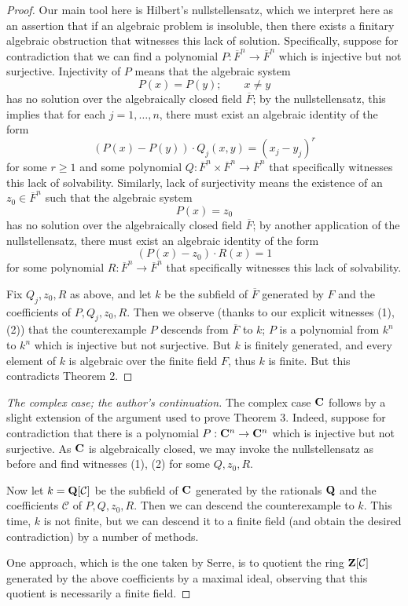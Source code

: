\begin{proof}
Our main tool here is Hilbert's nullstellensatz, which we interpret here as an assertion that if an algebraic problem is insoluble, then there exists a finitary algebraic obstruction that witnesses this lack of solution. Specifically, suppose for contradiction that we can find a polynomial $P:\overline F^n\to\overline F^n$ which is injective but not surjective. Injectivity of $P$ means that the algebraic system
\[P(x)=P(y);\qquad x\ne y\]
has no solution over the algebraically closed field $\overline F$; by the nullstellensatz, this implies that for each $j=1,\dots,n$, there must exist an algebraic identity of the form
\[(P(x)-P(y))\cdot Q_j(x,y)=(x_j-y_j)^r \tag{1}\]
for some $r\ge1$ and some polynomial $Q:\overline F^n\times\overline F^n\to\overline F^n$ that specifically witnesses this lack of solvability. Similarly, lack of surjectivity means the existence of an $z_0\in\overline F^n$ such that the algebraic system
\[P(x)=z_0\]
has no solution over the algebraically closed field $\overline F$; by another application of the nullstellensatz, there must exist an algebraic identity of the form
\[(P(x)-z_0)\cdot R(x)=1 \tag{2}\]
for some polynomial $R:\overline F^n\to\overline F^n$ that specifically witnesses this lack of solvability.

Fix $Q_j,z_0,R$ as above, and let $k$ be the subfield of $\overline F$ generated by $F$ and the coefficients of $P,Q_j,z_0,R$. Then we observe (thanks to our explicit witnesses (1), (2)) that the counterexample $P$ descends from $\overline F$ to $k$; $P$ is a polynomial from $k^n$ to $k^n$ which is injective but not surjective. But $k$ is finitely generated, and every element of $k$ is algebraic over the finite field $F$, thus $k$ is finite. But this contradicts Theorem 2.
\end{proof}
\begin{proof}[The complex case; the author's continuation]
The complex case ${\bf C}$ follows by a slight extension of the argument used to prove Theorem 3. Indeed, suppose for contradiction that there is a polynomial $P:{\bf C}^n\to{\bf C}^n$ which is injective but not surjective. As ${\bf C}$ is algebraically closed, we may invoke the nullstellensatz as before and find witnesses (1), (2) for some $Q,z_0,R$.

Now let $k={\bf Q}[\mathcal C]$ be the subfield of ${\bf C}$ generated by the rationals ${\bf Q}$ and the coefficients $\mathcal C$ of $P,Q,z_0,R$. Then we can descend the counterexample to $k$. This time, $k$ is not finite, but we can descend it to a finite field (and obtain the desired contradiction) by a number of methods.

One approach, which is the one taken by Serre, is to quotient the ring ${\bf Z}[\mathcal C]$ generated by the above coefficients by a maximal ideal, observing that this quotient is necessarily a finite field.
\end{proof}
